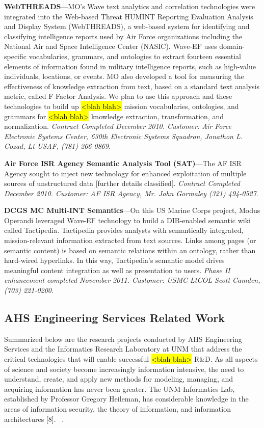 \documentclass{sbir}
\begin{document}
{\bf WebTHREADS}---MO's Wave text analytics and correlation technologies were integrated into the Web-based Threat HUMINT Reporting Evaluation Analysis and Display System (WebTHREADS), a web-based system for identifying and classifying intelligence reports used by Air Force organizations including the National Air and Space Intelligence Center (NASIC). Wave-EF uses domain-specific vocabularies, grammars, and ontologies to extract fourteen essential elements of information found in military intelligence reports, such as high-value individuals, locations, or events. MO also developed a tool for measuring the effectiveness of knowledge extraction from text, based on a standard text analysis metric, called F Factor Analysis. We plan to use this approach and these technologies to build up \hl{<blah blah>} mission vocabularies, ontologies, and grammars for  \hl{<blah blah>}  knowledge extraction, transformation, and normalization. \emph{Contract Completed December 2010. Customer: Air Force Electronic Systems Center, 630th Electronic Systems Squadron, Jonathon L. Cozad,  Lt USAF, (781) 266-0869}.

{\bf Air Force ISR Agency Semantic Analysis Tool (SAT)}---The AF ISR Agency sought to inject new technology for enhanced exploitation of multiple sources of unstructured data [further details classified]. \emph{Contract Completed December 2010. Customer: AF ISR Agency, Mr. John Gormaley (321) 494-0527}.

{\bf DCGS MC Multi-INT Semantics}---On this US Marine Corps project, Modus Operandi leveraged Wave-EF technology to build a DIB-enabled semantic wiki called Tactipedia. Tactipedia provides analysts with semantically integrated, mission-relevant information extracted from text sources. Links among pages (or semantic content) is based on semantic relations within an ontology, rather than hard-wired hyperlinks. In this way, Tactipedia's semantic model drives meaningful content integration as well as presentation to users. \emph{Phase II enhancement completed November 2011. Customer: USMC LtCOL Scott Camden, (703) 221-0200}.

\subsection{AHS Engineering Services Related Work}
Summarized below are the research projects conducted by AHS Engineering Services and the Informatics Research Laboratory at UNM that address the critical technologies that will enable successful \hl{<blah blah>} R\&D. As all aspects of science and society become increasingly information intensive, the need to understand, create, and apply new methods for modeling, managing, and acquiring information has never been greater. The UNM Informatics Lab, established by Professor Gregory Heileman, has considerable knowledge in the areas of information security, the theory of information, and information architectures [8].
~\cite{HeHeShGiJa:11,JaHe:08,JaHeLa:10,JaLaHe:11,LaJaBoNaHe:11,LaJaHeAb:11,LaHe:12,LaHe:13,PaSa:04,PuWe:02,SeKaBe:09,Co:09,Po:12}.
\end{document}
